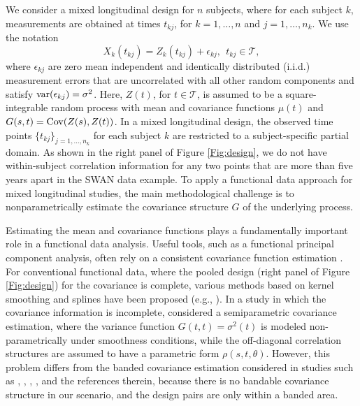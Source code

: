 \documentclass[11pt]{article}
\newcommand{\0}{{\mathbf{0}}}
\newcommand{\1}{{\mathbf{1}}}
\newcommand{\var}{{\rm var}}
\newcommand{\cov}{{\rm Cov}}
\begin{document}
We consider a mixed longitudinal design for $n$ subjects, where for each subject $k$, measurements are obtained at times $t_{kj}$, for $k = 1, \dots, n$ and $j = 1, \dots, n_k$. We use the notation 
\begin{equation}\label{datamodel}
X_k(t_{kj}) = Z_k(t_{kj}) + \epsilon_{kj}, \ \  t_{kj}\in \mathcal{T},
\end{equation}
where $\epsilon_{kj}$ are zero mean independent and identically distributed (i.i.d.) measurement errors that are uncorrelated with all other random components and satisfy $\var(\epsilon_{kj}) = \sigma^2$. Here, $Z(t)$, for $t \in \mathcal{T}$, is assumed to be a square-integrable random process with mean and covariance functions $\mu(t)$ and $G(s,t)= \cov(Z(s), Z(t))$. In a mixed longitudinal design, the observed time points $\{t_{kj}\}_{j = 1,\dots, n_k}$ for each subject $k$ are restricted to a subject-specific partial domain. As shown in the right panel of Figure \ref{Fig:design}, we do not have within-subject correlation information for any two points that are more than five years apart in the SWAN data example. To apply a functional data approach for mixed longitudinal studies, the main methodological challenge is to nonparametrically estimate the covariance structure $G$ of the underlying process. 

Estimating the mean and covariance functions plays a fundamentally important role in a functional data analysis. Useful tools, such as a functional principal component analysis, often rely on a consistent covariance function estimation \citep{yao2005functional, hall2006properties, li2010uniform}. For conventional functional data, where the pooled design (right panel of Figure \ref{Fig:design}) for the covariance is complete, various methods based on kernel smoothing and splines have been proposed (e.g., \cite{rice1991estimating, yao2005functional, peng2009geometric, xiao2013fast}). In a study in which the covariance information is incomplete, \cite{fan2007analysis} considered a semiparametric covariance estimation, where the variance function $G(t,t) =\sigma^2(t)$ is modeled non-parametrically under smoothness conditions, while the off-diagonal correlation structures are assumed to have a parametric form $\rho(s,t,\theta)$. 
However, this problem differs from the banded covariance estimation considered in studies such as \cite{bickel2008regularized}, \cite{cai2010optimal}, \cite{cai2012adaptive}, \cite{cai2016estimating}, and the references therein, because there is no bandable covariance structure in our scenario, and the design pairs are only within a banded area. 
\end{document}
